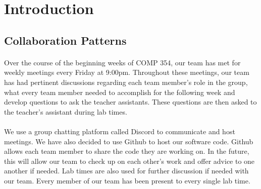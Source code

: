 \section{Introduction}
    \subsection{Collaboration Patterns}
        \paragraph{}
        Over the course of the beginning weeks of COMP 354, our team has met for weekly meetings every Friday at 9:00pm. Throughout these meetings, our team has had pertinent discussions regarding each team member’s role in the group, what every team member needed to accomplish for the following week and develop questions to ask the teacher assistants. These questions are then asked to the teacher’s assistant during lab times.

        \paragraph{}
        We use a group chatting platform called Discord to communicate and host meetings. We have also decided to use Github to host our software code. Github allows each team member to share the code they are working on. In the future, this will allow our team to check up on each other’s work and offer advice to one another if needed. Lab times are also used for further discussion if needed with our team. Every member of our team has been present to every single lab time.

